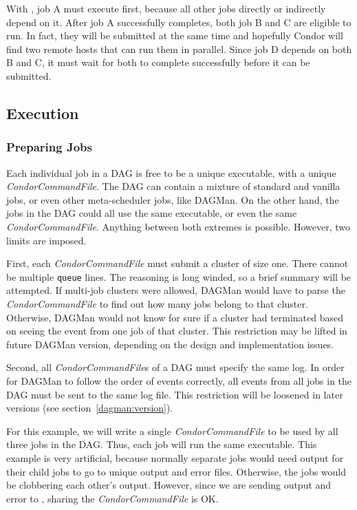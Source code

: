 With , job A must execute first, because all other jobs
directly or indirectly depend on it.  After job A successfully completes, both
job B and C are eligible to run.  In fact, they will be submitted at the same
time and hopefully Condor will find two remote hosts that can run them in
parallel.  Since job D depends on both B and C, it must wait for both to
complete successfully before it can be submitted.

\subsection{Execution}

\subsubsection{Preparing Jobs}
\label{dagman:prepjob}

Each individual job in a DAG is free to be a unique executable, with a unique
\textit{CondorCommandFile}.  The DAG can contain a mixture of standard and
vanilla jobs, or even other meta-scheduler jobs, like DAGMan.  On the other
hand, the jobs in the DAG could all use the same executable, or even the same
\textit{CondorCommandFile}.  Anything between both extremes is possible.
However, two limits are imposed.

First, each \textit{CondorCommandFile} must submit a cluster of size one.
There cannot be multiple \texttt{queue} lines.  The reasoning is long winded,
so a brief summary will be attempted.  If multi-job clusters were allowed,
DAGMan would have to parse the \textit{CondorCommandFile} to find out how many
jobs belong to that cluster.  Otherwise, DAGMan would not know for sure if a
cluster had terminated based on seeing the event from one job of that
cluster.  This restriction may be lifted in future DAGMan version, depending
on the design and implementation issues.

Second, all \textit{CondorCommandFile}s of a DAG must specify the same log.
In order for DAGMan to follow the order of events correctly, all events from
all jobs in the DAG must be sent to the same log file.  This restriction will
be loosened in later versions (see section~\ref{dagman:version}).

For this example, we will write a single \textit{CondorCommandFile} to be used
by all three jobs in the DAG.  Thus, each job will run the same executable.
This example is very artificial, because normally separate jobs would need
output for their child jobs to go to unique output and error files.
Otherwise, the jobs would be clobbering each other's output.  However, since
we are sending output and error to , sharing the
\textit{CondorCommandFile} is OK.

